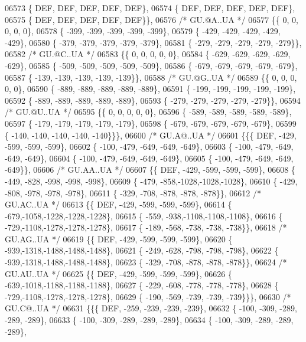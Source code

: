 \begin{DoxyCode}
06573 \{  DEF,  DEF,  DEF,  DEF,  DEF\},
06574 \{  DEF,  DEF,  DEF,  DEF,  DEF\},
06575 \{  DEF,  DEF,  DEF,  DEF,  DEF\}\},
06576 \textcolor{comment}{/* GU.@A..UA */}
06577 \{\{    0,    0,    0,    0,    0\},
06578 \{ -399, -399, -399, -399, -399\},
06579 \{ -429, -429, -429, -429, -429\},
06580 \{ -379, -379, -379, -379, -379\},
06581 \{ -279, -279, -279, -279, -279\}\},
06582 \textcolor{comment}{/* GU.@C..UA */}
06583 \{\{    0,    0,    0,    0,    0\},
06584 \{ -629, -629, -629, -629, -629\},
06585 \{ -509, -509, -509, -509, -509\},
06586 \{ -679, -679, -679, -679, -679\},
06587 \{ -139, -139, -139, -139, -139\}\},
06588 \textcolor{comment}{/* GU.@G..UA */}
06589 \{\{    0,    0,    0,    0,    0\},
06590 \{ -889, -889, -889, -889, -889\},
06591 \{ -199, -199, -199, -199, -199\},
06592 \{ -889, -889, -889, -889, -889\},
06593 \{ -279, -279, -279, -279, -279\}\},
06594 \textcolor{comment}{/* GU.@U..UA */}
06595 \{\{    0,    0,    0,    0,    0\},
06596 \{ -589, -589, -589, -589, -589\},
06597 \{ -179, -179, -179, -179, -179\},
06598 \{ -679, -679, -679, -679, -679\},
06599 \{ -140, -140, -140, -140, -140\}\}\},
06600 \textcolor{comment}{/* GU.A@..UA */}
06601 \{\{\{  DEF, -429, -599, -599, -599\},
06602 \{ -100, -479, -649, -649, -649\},
06603 \{ -100, -479, -649, -649, -649\},
06604 \{ -100, -479, -649, -649, -649\},
06605 \{ -100, -479, -649, -649, -649\}\},
06606 \textcolor{comment}{/* GU.AA..UA */}
06607 \{\{  DEF, -429, -599, -599, -599\},
06608 \{ -449, -828, -998, -998, -998\},
06609 \{ -479, -858,-1028,-1028,-1028\},
06610 \{ -429, -808, -978, -978, -978\},
06611 \{ -329, -708, -878, -878, -878\}\},
06612 \textcolor{comment}{/* GU.AC..UA */}
06613 \{\{  DEF, -429, -599, -599, -599\},
06614 \{ -679,-1058,-1228,-1228,-1228\},
06615 \{ -559, -938,-1108,-1108,-1108\},
06616 \{ -729,-1108,-1278,-1278,-1278\},
06617 \{ -189, -568, -738, -738, -738\}\},
06618 \textcolor{comment}{/* GU.AG..UA */}
06619 \{\{  DEF, -429, -599, -599, -599\},
06620 \{ -939,-1318,-1488,-1488,-1488\},
06621 \{ -249, -628, -798, -798, -798\},
06622 \{ -939,-1318,-1488,-1488,-1488\},
06623 \{ -329, -708, -878, -878, -878\}\},
06624 \textcolor{comment}{/* GU.AU..UA */}
06625 \{\{  DEF, -429, -599, -599, -599\},
06626 \{ -639,-1018,-1188,-1188,-1188\},
06627 \{ -229, -608, -778, -778, -778\},
06628 \{ -729,-1108,-1278,-1278,-1278\},
06629 \{ -190, -569, -739, -739, -739\}\}\},
06630 \textcolor{comment}{/* GU.C@..UA */}
06631 \{\{\{  DEF, -259, -239, -239, -239\},
06632 \{ -100, -309, -289, -289, -289\},
06633 \{ -100, -309, -289, -289, -289\},
06634 \{ -100, -309, -289, -289, -289\},

\end{DoxyCode}
